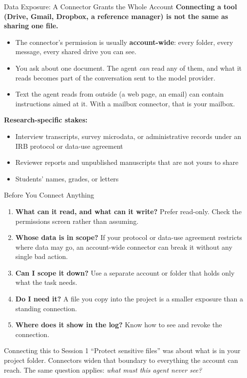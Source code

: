 \documentclass[aspectratio=169, 11pt]{beamer}
\begin{document}
\begin{frame}{Data Exposure: A Connector Grants the Whole Account}
  \textbf{Connecting a tool (Drive, Gmail, Dropbox, a reference manager) is not the same as sharing one file.}

  \vspace{0.5em}
  \begin{itemize}
    \item The connector's permission is usually \textbf{account-wide}: every folder, every message, every shared drive you can see.
    \item You ask about one document. The agent \emph{can} read any of them, and what it reads becomes part of the conversation sent to the model provider.
    \item Text the agent reads from outside (a web page, an email) can contain instructions aimed at it. With a mailbox connector, that is your mailbox. \hfill \hyperlink{pinj}{}
  \end{itemize}

  \vspace{0.6em}
  \textbf{Research-specific stakes:}
  \begin{itemize}\small
    \item Interview transcripts, survey microdata, or administrative records under an IRB protocol or data-use agreement
    \item Reviewer reports and unpublished manuscripts that are not yours to share
    \item Students' names, grades, or letters
  \end{itemize}
\end{frame}

\begin{frame}{Before You Connect Anything}
  \begin{enumerate}
    \item \textbf{What can it read, and what can it write?} Prefer read-only. Check the permissions screen rather than assuming.
    \item \textbf{Whose data is in scope?} If your protocol or data-use agreement restricts where data may go, an account-wide connector can break it without any single bad action.
    \item \textbf{Can I scope it down?} Use a separate account or folder that holds only what the task needs.
    \item \textbf{Do I need it?} A file you copy into the project is a smaller exposure than a standing connection.
    \item \textbf{Where does it show in the log?} Know how to see and revoke the connection.
  \end{enumerate}

  \vspace{0.8em}
  \begin{block}{Connecting this to Session 1}
    ``Protect sensitive files'' was about what is in your project folder. Connectors widen that boundary to everything the account can reach. The same question applies: \emph{what must this agent never see?}
  \end{block}
\end{frame}
\end{document}
